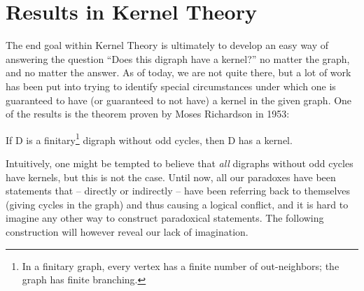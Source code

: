 \section{Results in Kernel Theory}
\label{sec:Results in Kernel Theory}
The end goal within Kernel Theory is ultimately to develop an easy way of answering the question ``Does this digraph have a kernel?'' no matter the graph, and no matter the answer.
As of today, we are not quite there, but a lot of work has been put into trying to identify special circumstances under which one is guaranteed to have (or guaranteed to not have) a kernel in the given graph.
One of the results is the theorem proven by Moses Richardson in 1953:\\

\begin{theorem}
  If D is a finitary\footnote{In a finitary graph, every vertex has a finite number of out-neighbors; the graph has finite branching.} digraph without odd cycles, then D has a kernel.
\end{theorem}

Intuitively, one might be tempted to believe that \textit{all} digraphs without odd cycles have kernels, but this is not the case.
Until now, all our paradoxes have been statements that -- directly or indirectly -- have been referring back to themselves (giving cycles in the graph) and thus causing a logical conflict, and it is hard to imagine any other way to construct paradoxical statements.
The following construction will however reveal our lack of imagination.

